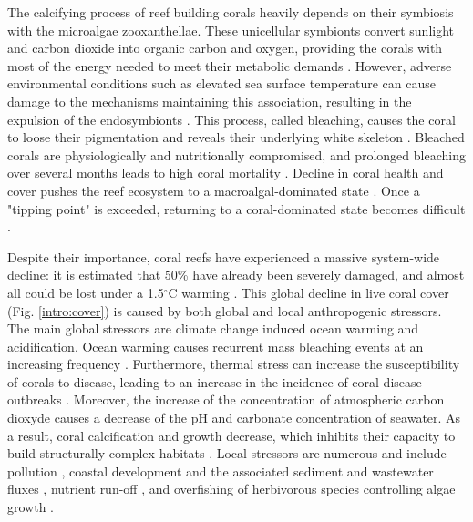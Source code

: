 The calcifying process of reef building corals heavily depends on their symbiosis with the microalgae zooxanthellae. These unicellular symbionts convert sunlight and carbon dioxide into organic carbon and oxygen, providing the corals with most of the energy needed to meet their metabolic demands \citep{muscatine1977reef}. However, adverse environmental conditions such as elevated sea surface temperature can cause damage to the mechanisms maintaining this association, resulting in the expulsion of the endosymbionts \citep{hoegh2007coral}. This process, called bleaching, causes the coral to loose their pigmentation and reveals their underlying white skeleton \citep{baker2008climate}. Bleached corals are physiologically and nutritionally compromised, and prolonged bleaching over several months leads to high coral mortality \citep{hughes2018spatial}. Decline in coral health and cover pushes the reef ecosystem to a macroalgal-dominated state \citep{hughes2003climate,mumby2007thresholds}. Once a "tipping point" is exceeded, returning to a coral-dominated state becomes difficult \citep{mumby2007thresholds,graham2015predicting}.

Despite their importance, coral reefs have experienced a massive system-wide decline: it is estimated  that 50\% have already been severely damaged, and almost all could be lost under a 1.5$^\circ$C warming \citep{hoegh2019people,dixon2022future}. This global decline in live coral cover \citep{gardner2003long,pandolfi2003global,pandolfi2011projecting,bruno2007regional,perry2013caribbean,dove2020ocean} (Fig. \ref{intro:cover}) is caused by both global and local anthropogenic stressors. The main global stressors are climate change induced ocean warming and acidification. Ocean warming causes recurrent mass bleaching events at an increasing frequency \citep{connell199730, hughes2018spatial}. Furthermore, thermal stress can increase the susceptibility of corals to disease, leading to an increase in the incidence of coral disease outbreaks \citep{harvell2002climate,bruno2007thermal,muller2012caribbean}. Moreover, the increase of the concentration of atmospheric carbon dioxyde causes a decrease of the pH and carbonate concentration of seawater. As a result, coral calcification and growth decrease, which inhibits their capacity to build structurally complex habitats \citep{hoegh2007coral}. Local stressors are numerous and include pollution \citep{loya1980effects}, coastal development and the associated sediment and wastewater fluxes \citep{erftemeijer2012environmental, cunning2019extensive}, nutrient run-off \citep{hughes2003climate,sheppard2017biology}, and overfishing of herbivorous species controlling algae growth \citep{jackson2001historical}.

